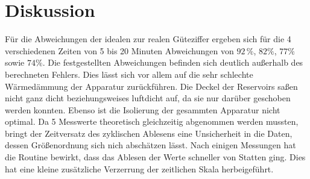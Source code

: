 \section{Diskussion}
\label{sec:Diskussion}
Für die Abweichungen der idealen zur realen Güteziffer ergeben
sich für die 4 verschiedenen Zeiten von 5 bis 20 Minuten Abweichungen von $92\,\%$,
$82\%$, $77\%$ sowie $74\%$. Die festgestellten Abweichungen befinden sich deutlich 
außerhalb des berechneten Fehlers. Dies lässt sich vor allem auf die sehr 
schlechte Wärmedämmung der Apparatur zurückführen. Die Deckel der
Reservoirs saßen nicht ganz dicht beziehungsweises luftdicht auf, da sie nur darüber 
geschoben werden konnten. Ebenso ist die Isolierung der gesammten Apparatur
nicht optimal. Da 5 Messwerte theoretisch gleichzeitig abgenommen werden mussten,
bringt der Zeitversatz des zyklischen Ablesens eine Unsicherheit in die Daten,
dessen Größenordnung sich nich abschätzen lässt. Nach einigen Messungen hat die 
Routine bewirkt, dass das Ablesen der Werte schneller von Statten ging. Dies hat 
eine kleine zusätzliche Verzerrung der zeitlichen Skala herbeigeführt. 
